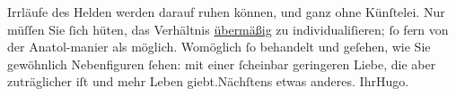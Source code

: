 \begin{ledgroupsized}[t]{13cm}
               Irrläufe des Helden werden darauf ruhen können, und ganz ohne Künſtelei. Nur müſſen
               Sie ſich hüten, das Verhältnis \uline{übermäßig} zu
               individualiſieren; ſo fern von der Anatol-manier
               als möglich.\pend
           \pstart
           Womöglich ſo behandelt und geſehen, wie Sie gewöhnlich Nebenfiguren ſehen: mit einer
               ſcheinbar geringeren Liebe, die aber zuträglicher iſt und mehr Leben giebt.\hspace*{2.5em}Nächſtens etwas anderes.\pend
           \pstart Ihr\spacefill\mbox{Hugo.}\pend{}
         
         \endnumbering{}\end{ledgroupsized}  \newcommand{\dateiname}{L00564}\newcommand{\titel}{Hugo von Hofmannsthal an Arthur Schnitzler, 16. 7. [1896]}\newcommand{\editorInnen}{Martin Anton Müller und Gerd-Hermann Susen}
      